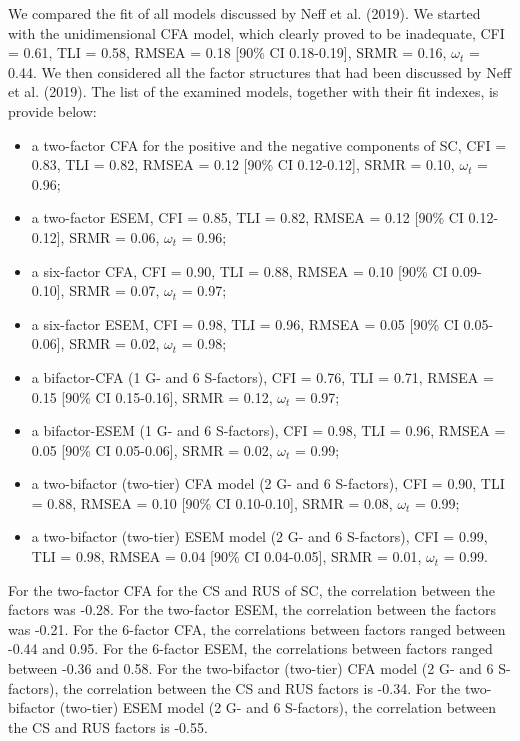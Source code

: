 \documentclass[
  english,
  man,floatsintext]{apa7}
\begin{document}
\begin{appendix}
We compared the fit of all models discussed by Neff et al. (2019). We
started with the unidimensional CFA model, which clearly proved to be
inadequate, CFI = 0.61, TLI = 0.58, RMSEA = 0.18 {[}90\% CI
0.18-0.19{]}, SRMR = 0.16, \(\omega_t\) = 0.44. We then considered all
the factor structures that had been discussed by Neff et al. (2019). The
list of the examined models, together with their fit indexes, is provide
below:

\begin{itemize}
\item
a two-factor CFA for the positive and the negative components of SC,
CFI = 0.83, TLI = 0.82, RMSEA = 0.12 {[}90\% CI 0.12-0.12{]}, SRMR =
0.10, \(\omega_t\) = 0.96;
\item
a two-factor ESEM, CFI = 0.85, TLI = 0.82, RMSEA = 0.12 {[}90\% CI
0.12-0.12{]}, SRMR = 0.06, \(\omega_t\) = 0.96;
\item
a six-factor CFA, CFI = 0.90, TLI = 0.88, RMSEA = 0.10 {[}90\% CI
0.09-0.10{]}, SRMR = 0.07, \(\omega_t\) = 0.97;
\item
a six-factor ESEM, CFI = 0.98, TLI = 0.96, RMSEA = 0.05 {[}90\% CI
0.05-0.06{]}, SRMR = 0.02, \(\omega_t\) = 0.98;
\item
a bifactor-CFA (1 G- and 6 S-factors), CFI = 0.76, TLI = 0.71, RMSEA =
0.15 {[}90\% CI 0.15-0.16{]}, SRMR = 0.12, \(\omega_t\) = 0.97;
\item
a bifactor-ESEM (1 G- and 6 S-factors), CFI = 0.98, TLI = 0.96, RMSEA
= 0.05 {[}90\% CI 0.05-0.06{]}, SRMR = 0.02, \(\omega_t\) = 0.99;
\item
a two-bifactor (two-tier) CFA model (2 G- and 6 S-factors), CFI =
0.90, TLI = 0.88, RMSEA = 0.10 {[}90\% CI 0.10-0.10{]}, SRMR = 0.08,
\(\omega_t\) = 0.99;
\item
a two-bifactor (two-tier) ESEM model (2 G- and 6 S-factors), CFI =
0.99, TLI = 0.98, RMSEA = 0.04 {[}90\% CI 0.04-0.05{]}, SRMR = 0.01,
\(\omega_t\) = 0.99.
\end{itemize}

For the two-factor CFA for the CS and RUS of SC, the correlation between
the factors was -0.28. For the two-factor ESEM, the correlation between
the factors was -0.21. For the 6-factor CFA, the correlations between
factors ranged between -0.44 and 0.95. For the 6-factor ESEM, the
correlations between factors ranged between -0.36 and 0.58. For the
two-bifactor (two-tier) CFA model (2 G- and 6 S-factors), the
correlation between the CS and RUS factors is -0.34. For the
two-bifactor (two-tier) ESEM model (2 G- and 6 S-factors), the
correlation between the CS and RUS factors is -0.55.


\end{appendix}
\end{document}
